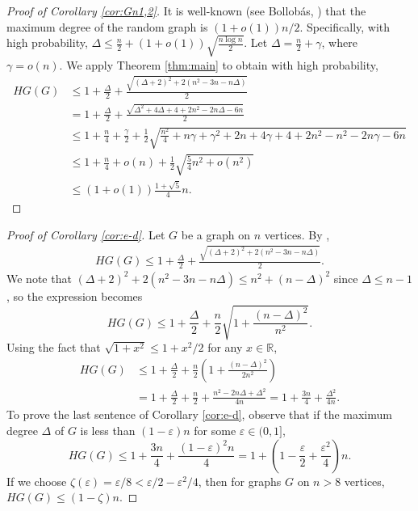 \documentclass{amsart}
\newcommand{\1}{\mathds{1}}
\numberwithin{theorem}{section}
\begin{document}
\begin{proof}[Proof of Corollary \ref{cor:Gn1,2}]
    It is well-known (see Bollobás, \cite{Bollobas2001}) that the maximum degree of the random graph is $(1+o(1))n/2$. Specifically, with high probability, $\Delta \leq \frac n 2 + (1+o(1)) \sqrt{\frac{n\log n}2}$. Let $\Delta = 
    \frac n 2+ \gamma$, where $\gamma=o(n)$. We apply Theorem \ref{thm:main} to obtain with high probability,
    \begin{align*}
        HG(G)&\leq 1+\frac{\Delta}{2}+ \frac{\sqrt{(\Delta +2)^2 + 2(n^2-3n-n\Delta)}}{2}
        \\&= 1+\frac \Delta 2 + \frac{\sqrt{\Delta ^2 +4\Delta +4+2n^2-2n\Delta -6n}}2
        \\&\leq 1+\frac n 4 + \frac \gamma 2+ \frac 1 2 \sqrt {\frac{n^2}{4}+n\gamma+\gamma^2+2n+4\gamma +4+2n^2-n^2-2n\gamma-6n}
        \\&\leq 1+\frac n 4 + o(n)+ \frac 1 2 \sqrt{\frac 5 4 n^2+o(n^2)}
        \\&\leq (1+o(1)) \frac{1+\sqrt 5}{4}n.
    \end{align*}
\end{proof}
\begin{proof}[Proof of Corollary \ref{cor:e-d}]
    Let $G$ be a graph on $n$ vertices. By , 
        \begin{align*}
        HG(G)\leq 1+\frac{\Delta}{2}+\frac{\sqrt{(\Delta+2)^2+2(n^2-3n-n\Delta)}}{2}.
        \end{align*}
        We note that $(\Delta+2)^2+2(n^2-3n-n\Delta)\leq n^2+(n-\Delta)^2$ since $\Delta\leq n-1$, so the expression becomes 
        $$HG(G)\leq 1+\frac \Delta 2+\frac{n}{2}\sqrt{1+\frac{(n-\Delta)^2}{n^2}}.$$ 
        Using the fact that $\sqrt{1+x^2}\leq 1+x^2/2$ for any $x \in \mathbb{R}$,
        \begin{align*} 
        HG(G)&\leq 1+\frac{\Delta}{2}+\frac{n}{2}\left(1+\frac{(n-\Delta)^2}{2n^2}\right)\\
        &=1+\frac{\Delta}{2}+\frac{n}{2}+\frac{n^2-2n\Delta+\Delta^2}{4n}=1+\frac{3n}{4}+\frac{\Delta^2}{4n}.
        \end{align*}
       To prove the last sentence of Corollary \ref{cor:e-d}, observe that if the maximum degree $\Delta$ of $G$ is less than $(1-\varepsilon)n$ for some $\varepsilon \in (0,1]$, $$HG(G)\leq 1+\frac{3n}{4}+\frac{(1-\varepsilon)^2n}{4}=1+\left(1-\frac \varepsilon 2+\frac{\varepsilon^2} 4\right)n.$$ 
       If we choose $\zeta(\varepsilon)= \varepsilon/8<\varepsilon/2-\varepsilon^2/4$, then for graphs $G$ on $n>8$ vertices, $HG(G) \leq (1-\zeta)n.$
\end{proof}
\end{document}
